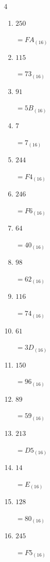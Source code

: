 \begin{multicols}{4}
\begin{enumerate}
  \item $250$

        $=FA_{(16)}$

\columnbreak %

  \item $115$

        $=73_{(16)}$

  \item $91$

        $=5B_{(16)}$

  \item $7$

        $=7_{(16)}$

  \item $244$

        $=F4_{(16)}$

  \item $246$

        $=F6_{(16)}$

  \item $64$

        $=40_{(16)}$

  \item $98$

        $=62_{(16)}$

  \item $116$

        $=74_{(16)}$

  \item $61$

        $=3D_{(16)}$

  \item $150$

        $=96_{(16)}$

  \item $89$

        $=59_{(16)}$

  \item $213$

        $=D5_{(16)}$

  \item $14$

        $=E_{(16)}$

  \item $128$

        $=80_{(16)}$

  \item $245$

        $=F5_{(16)}$

\columnbreak %


\end{enumerate}
\end{multicols}
